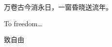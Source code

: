 \cleardoublepage
\thispagestyle{empty}


\vspace*{3cm}

\begin{raggedleft}
\begin{CJK*}{UTF8}{gbsn}
	万卷古今消永日，一窗昏晓送流年。\\
     \end{CJK*}
\end{raggedleft}

\vspace{4cm}

\begin{center}
    To freedom\dots \\
    \begin{CJK*}{UTF8}{gbsn}
    致自由
    \end{CJK*}
\end{center}
